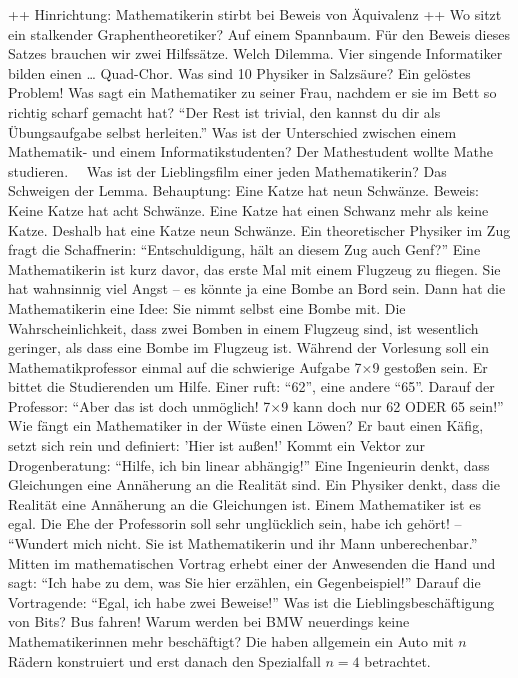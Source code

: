 {	\or ++ Hinrichtung: Mathematikerin stirbt bei Beweis von Äquivalenz ++
	\or Wo sitzt ein stalkender Graphentheoretiker? Auf einem Spannbaum.
	\or Für den Beweis dieses Satzes brauchen wir zwei Hilfssätze. Welch Dilemma.
	\or Vier singende Informatiker bilden einen … Quad-Chor.
	\or Was sind 10 Physiker in Salzsäure? Ein gelöstes Problem!
	\or Was sagt ein Mathematiker zu seiner Frau, nachdem er sie im Bett so richtig scharf gemacht hat? \enquote{Der Rest ist trivial, den kannst du dir als Übungsaufgabe selbst herleiten.}
	\or Was ist der Unterschied zwischen einem Mathematik- und einem Informatikstudenten? Der Mathestudent wollte Mathe studieren.
	\or\ 
	\or\ 
	\or Was ist der Lieblingsfilm einer jeden Mathematikerin? Das Schweigen der Lemma.
	\or Behauptung: Eine Katze hat neun Schwänze. Beweis: Keine Katze hat acht Schwänze. Eine Katze hat einen Schwanz mehr als keine Katze. Deshalb hat eine Katze neun Schwänze.
	\or Ein theoretischer Physiker im Zug fragt die Schaffnerin: \enquote{Entschuldigung, hält an diesem Zug auch Genf?}
	\or Eine Mathematikerin ist kurz davor, das erste Mal mit einem Flugzeug zu fliegen. Sie hat wahnsinnig viel Angst -- es könnte ja eine Bombe an Bord sein. Dann hat die Mathematikerin eine Idee: Sie nimmt selbst eine Bombe mit. Die Wahrscheinlichkeit, dass zwei Bomben in einem Flugzeug sind, ist wesentlich geringer, als dass eine Bombe im Flugzeug ist.
	\or Während der Vorlesung soll ein Mathematikprofessor einmal auf die schwierige Aufgabe 7$\times$9 gestoßen sein. Er bittet die Studierenden um Hilfe. Einer ruft: \enquote{62}, eine andere \enquote{65}. Darauf der Professor: \enquote{Aber das ist doch unmöglich! 7$\times$9 kann doch nur 62 ODER 65 sein!}
	\or Wie fängt ein Mathematiker in der Wüste einen Löwen? Er baut einen Käfig, setzt sich rein und definiert: 'Hier ist außen!'
	\or Kommt ein Vektor zur Drogenberatung: \enquote{Hilfe, ich bin linear abhängig!}
	\or Eine Ingenieurin denkt, dass Gleichungen eine Annäherung an die Realität sind. Ein Physiker denkt, dass die Realität eine Annäherung an die Gleichungen ist. Einem Mathematiker ist es egal.
	\or Die Ehe der Professorin soll sehr unglücklich sein, habe ich gehört! -- \enquote{Wundert mich nicht. Sie ist Mathematikerin und ihr Mann unberechenbar.}
	\or Mitten im mathematischen Vortrag erhebt einer der Anwesenden die Hand und sagt: \enquote{Ich habe zu dem, was Sie hier erzählen, ein Gegenbeispiel!} Darauf die Vortragende: \enquote{Egal, ich habe zwei Beweise!}
	\or Was ist die Lieblingsbeschäftigung von Bits? Bus fahren!
	\or Warum werden bei BMW neuerdings keine Mathematikerinnen mehr beschäftigt? Die haben allgemein ein Auto mit $n$ Rädern konstruiert und erst danach den Spezialfall $n=4$ betrachtet.
}
